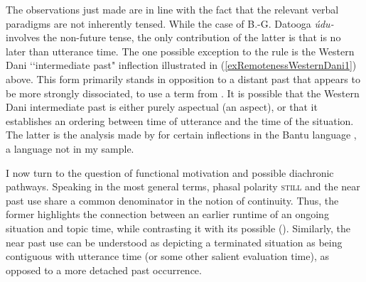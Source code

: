 The observations just made are in line with the fact that the relevant verbal paradigms are not inherently tensed. While the case of B.-G. Datooga \mbox{\textit{údu-}} involves the non-future tense, the only contribution of the latter is that  is no later than utterance time. The one possible exception to the rule is the Western Dani  \lq\lq intermediate past" inflection illustrated in (\ref{exRemotenessWesternDani1}) above. This form primarily stands in opposition to a distant past that appears to be more strongly dissociated, to use a term from \textcite{BotneKershner2008}.  It is possible that the Western Dani intermediate past is either purely aspectual (an  aspect), or that it establishes an ordering between time of utterance and the time of the situation. The latter is the analysis made by \textcite{CableGikuyu} for certain  inflections in the Bantu language , a language not in my sample.

I now turn to the question of functional motivation and possible diachronic pathways. Speaking in the most general terms, phasal polarity \textsc{still} and the near past use share a common denominator in the notion of continuity. Thus, the former highlights the connection between an earlier runtime of an ongoing situation and topic time, while contrasting it with its possible  (). Similarly, the near past use can be understood as depicting a terminated situation as being contiguous with utterance time (or some other salient evaluation time), as opposed to a more detached past occurrence.

